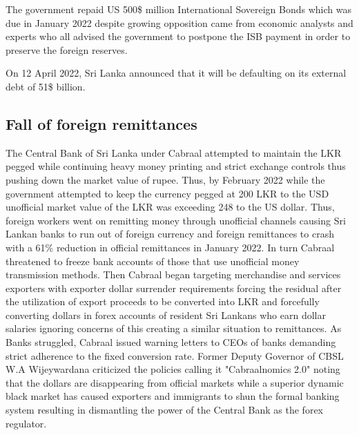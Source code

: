 \documentclass[a4paper,12pt]{article}
\begin{document}
The government repaid US 500\$ million International Sovereign Bonds which was due in January 2022 despite growing opposition came from economic analysts and experts who all advised the government to postpone the ISB payment in order to preserve the foreign reserves.

On 12 April 2022, Sri Lanka announced that it will be defaulting on its external debt of 51\$ billion.

\subsection{Fall of foreign remittances}
The Central Bank of Sri Lanka under Cabraal attempted to maintain the LKR pegged while continuing heavy money printing and strict exchange controls thus pushing down the market value of rupee. Thus, by February 2022 while the government attempted to keep the currency pegged at 200 LKR to the USD unofficial market value of the LKR was exceeding 248 to the US dollar. Thus, foreign workers went on remitting money through unofficial channels causing Sri Lankan banks to run out of foreign currency and foreign remittances to crash with a 61\% reduction in official remittances in January 2022. In turn Cabraal threatened to freeze bank accounts of those that use unofficial money transmission methods. Then Cabraal began targeting merchandise and services exporters with exporter dollar surrender requirements forcing the residual after the utilization of export proceeds to be converted into LKR and forcefully converting dollars in forex accounts of resident Sri Lankans who earn dollar salaries ignoring concerns of this creating a similar situation to remittances. As Banks struggled, Cabraal issued warning letters to CEOs of banks demanding strict adherence to the fixed conversion rate. Former Deputy Governor of CBSL W.A Wijeywardana criticized the policies calling it "Cabraalnomics 2.0" noting that the dollars are disappearing from official markets while a superior dynamic black market has caused exporters and immigrants to shun the formal banking system resulting in dismantling the power of the Central Bank as the forex regulator.
\end{document}
